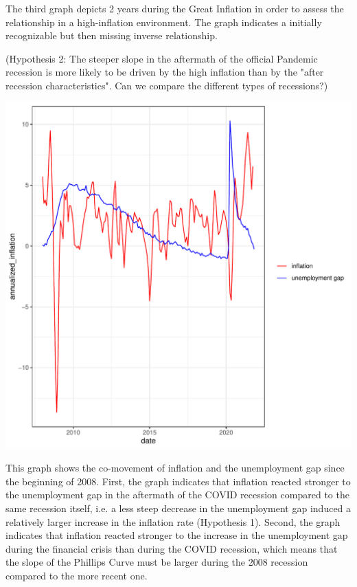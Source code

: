 \documentclass{article}\usepackage[]{graphicx}\usepackage[]{color}
\makeatletter
\def\maxwidth{ %
  \ifdim\Gin@nat@width>\linewidth
    \linewidth
  \else
    \Gin@nat@width
  \fi
}
\newenvironment{knitrout}{}{} %
\makeatother
\begin{document}
The third graph depicts 2 years during the Great Inflation in order to assess the relationship in a high-inflation environment. The graph indicates a initially recognizable but then missing inverse relationship. 

(Hypothesis 2: The steeper slope in the aftermath of the official Pandemic recession is more likely to be driven by the high inflation than by the "after recession characteristics". Can we compare the different types of recessions?) 

\begin{knitrout}
\color{fgcolor}
\includegraphics[width=\maxwidth]{figure/unnamed-chunk-2-1} 

\end{knitrout}

This graph shows the co-movement of inflation and the unemployment gap since the beginning of 2008. First, the graph indicates that inflation reacted stronger to the unemployment gap in the aftermath of the COVID recession compared to the same recession itself, i.e. a less steep decrease in the unemployment gap induced a relatively larger increase in the inflation rate (Hypothesis 1). Second, the graph indicates that inflation reacted stronger to the increase in the unemployment gap during the financial crisis than during the COVID recession, which means that the slope of the Phillips Curve must be larger during the 2008 recession compared to the more recent one. \\
\end{document}
